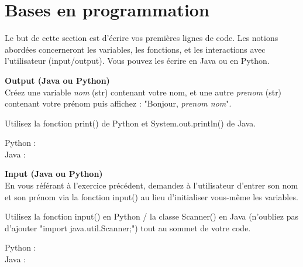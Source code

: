 \newpage
\section{Bases en programmation}
Le but de cette section est d'écrire vos premières lignes de code. Les notions abordées concerneront les variables, les fonctions, et les interactions avec l'utilisateur (input/output). Vous pouvez les écrire en Java ou en Python.\\

\begin{Exercice}[2 minutes] \textbf{Output (Java ou Python)}\\
   Créez une variable \textit{nom} (str) contenant votre nom, et une autre \textit{prenom} (str) contenant votre prénom puis affichez : "Bonjour, \textit{prenom nom}". \\
   
    \begin{conseil}
        Utilisez la fonction print() de Python et System.out.println() de Java. 
        
    \end{conseil}
    \begin{solution}
    
    Python : \\
    
    
    
    Java : \\
    
      
       
        
    \end{solution}   
\end{Exercice}

\begin{Exercice}[3 minutes] \textbf{Input (Java ou Python)}\\
   En vous référant à l'exercice précédent, demandez à l'utilisateur d'entrer son nom et son prénom via la fonction input() au lieu d'initialiser vous-même les variables. \\
   
    \begin{conseil}
       Utilisez la fonction input() en Python / la classe Scanner() en Java (n'oubliez pas d'ajouter "import java.util.Scanner;") tout au sommet de votre code. 
        
    \end{conseil}
    \begin{solution}
    
    Python : \\
    
    
    
    Java : \\
    
      
       
        
    \end{solution}   
\end{Exercice}

